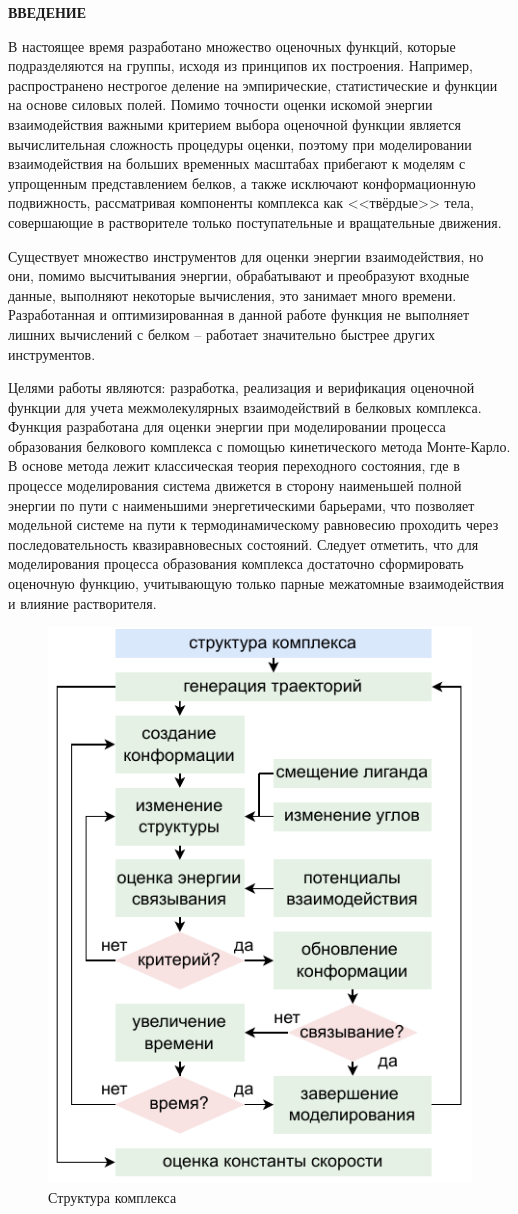 \newpage
\begin{center}
  \textbf{\large ВВЕДЕНИЕ}
\end{center}

В настоящее время разработано множество оценочных функций, которые подразделяются на группы, исходя из принципов их построения. Например, распространено нестрогое деление на эмпирические, статистические и функции на основе силовых полей\cite{ci500731a}. Помимо точности оценки искомой энергии взаимодействия важными критерием выбора оценочной функции является вычислительная сложность процедуры оценки, поэтому при моделировании взаимодействия на больших временных масштабах прибегают к моделям с упрощенным представлением белков\cite{biom10071056}, а также исключают конформационную подвижность, рассматривая компоненты комплекса как <<твёрдые>> тела, совершающие в растворителе только поступательные и вращательные движения.

Существует множество инструментов для оценки энергии взаимодействия, но они, помимо высчитывания энергии, обрабатывают и преобразуют входные данные, выполняют некоторые вычисления, это занимает много времени. Разработанная и оптимизированная в данной работе функция не выполняет лишних вычислений с белком -- работает значительно быстрее других инструментов.

Целями работы являются: разработка, реализация и верификация оценочной функции для учета межмолекулярных взаимодействий в белковых комплекса.
Функция разработана для оценки энергии при моделировании процесса образования белкового комплекса с помощью кинетического метода Монте-Карло\cite{Voter}. В основе метода лежит классическая теория переходного состояния, где в процессе моделирования система движется в сторону наименьшей полной энергии по пути с наименьшими энергетическими барьерами, что позволяет модельной системе на пути к термодинамическому равновесию проходить через последовательность квазиравновесных состояний. Следует отметить, что для моделирования процесса образования комплекса достаточно сформировать оценочную функцию, учитывающую только парные межатомные взаимодействия и влияние растворителя\cite{biom10071056}. 

\newpage
\begin{figure}[h!]
	\centering
	\includegraphics[width=0.6\linewidth]{images/kmc.pdf}
	\caption{Структура комплекса}
	\label{monte}
\end{figure}
